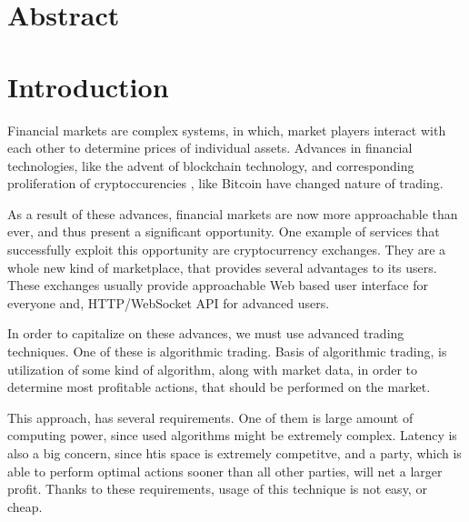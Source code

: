 \chapter*{Abstract}
\label{abstract}









\chapter{Introduction}
\label{introduction}
Financial markets are complex systems, in which, market players interact with each other to determine
prices of individual assets. Advances in financial technologies, like the advent of blockchain technology,
and corresponding proliferation of cryptoccurencies , like Bitcoin have changed nature of trading.

As a result of these advances, financial markets are now more approachable than ever, and thus present a significant
opportunity. One example of services that successfully exploit this opportunity are cryptocurrency exchanges. They
are a whole new kind of marketplace, that provides several advantages to its users. These exchanges usually provide
approachable Web based user interface for everyone and, HTTP/WebSocket API for advanced users.

In order to capitalize on these advances, we must use advanced trading techniques. One of these is algorithmic
trading. Basis of algorithmic trading, is utilization of some kind of algorithm, along with market data, in
order to determine most profitable actions, that should be performed on the market.

This approach, has several requirements. One of them is large amount of computing power, since used algorithms
might be extremely complex. Latency is also a big concern, since htis space is extremely competitve, and a party,
which is able to perform optimal actions sooner than all other parties, will net a larger profit.
Thanks to these requirements, usage of this technique is not easy, or cheap.

